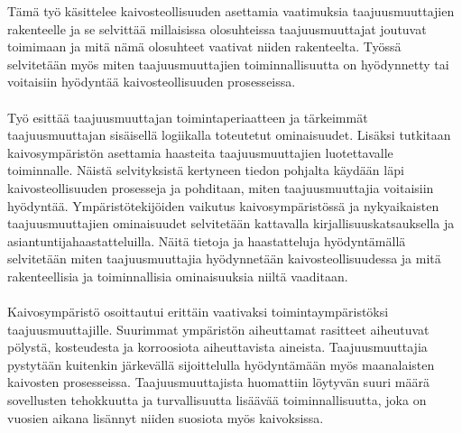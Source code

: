 \documentclass[finnish,12pt,a4paper,pdftex,elec,utf8]{aaltothesis}
\begin{document}
\begin{abstractpage}[finnish]
Tämä työ käsittelee kaivosteollisuuden asettamia vaatimuksia taajuusmuuttajien rakenteelle ja se selvittää millaisissa olosuhteissa taajuusmuuttajat joutuvat toimimaan ja mitä nämä olosuhteet vaativat niiden rakenteelta. Työssä selvitetään myös miten taajuusmuuttajien toiminnallisuutta on hyödynnetty tai voitaisiin hyödyntää kaivosteollisuuden prosesseissa.
\\\\
Työ esittää taajuusmuuttajan toimintaperiaatteen ja tärkeimmät taajuusmuuttajan sisäisellä logiikalla toteutetut ominaisuudet. Lisäksi tutkitaan kaivosympäristön asettamia haasteita taajuusmuuttajien luotettavalle toiminnalle. Näistä selvityksistä kertyneen tiedon pohjalta käydään läpi kaivosteollisuuden prosesseja ja pohditaan, miten taajuusmuuttajia voitaisiin hyödyntää. Ympäristötekijöiden vaikutus kaivosympäristössä ja nykyaikaisten taajuusmuuttajien ominaisuudet selvitetään kattavalla kirjallisuuskatsauksella ja asiantuntijahaastatteluilla. Näitä tietoja ja haastatteluja hyödyntämällä selvitetään miten taajuusmuuttajia hyödynnetään kaivosteollisuudessa ja mitä rakenteellisia ja toiminnallisia ominaisuuksia niiltä vaaditaan.
\\\\
Kaivosympäristö osoittautui erittäin vaativaksi toimintaympäristöksi taajuusmuuttajille. Suurimmat ympäristön aiheuttamat rasitteet aiheutuvat pölystä, kosteudesta ja korroosiota aiheuttavista aineista. Taajuusmuuttajia pystytään kuitenkin järkevällä sijoittelulla hyödyntämään myös maanalaisten kaivosten prosesseissa. Taajuusmuuttajista huomattiin löytyvän suuri määrä sovellusten tehokkuutta ja turvallisuutta lisäävää toiminnallisuutta, joka on vuosien aikana lisännyt niiden suosiota myös kaivoksissa.

\end{abstractpage}

\newpage

\thesistableofcontents


\end{document}
